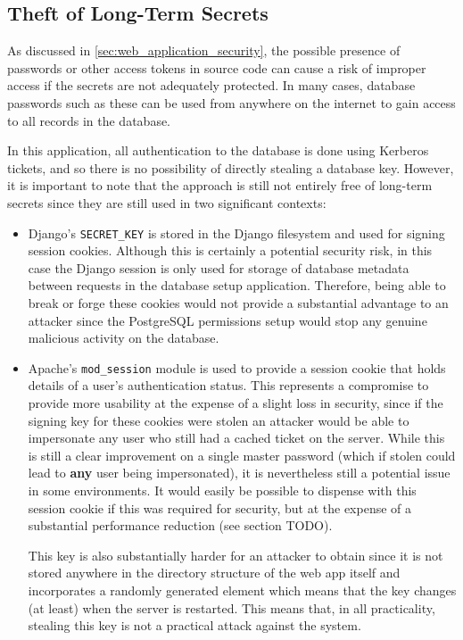 \documentclass{report}
\begin{document}
\subsection{Theft of Long-Term Secrets}
As discussed in \autoref{sec:web_application_security}, the possible presence of passwords or other access tokens in source code can cause a risk of improper access if the secrets are not adequately protected. In many cases, database passwords such as these can be used from anywhere on the internet to gain access to all records in the database.

In this application, all authentication to the database is done using Kerberos tickets, and so there is no possibility of directly stealing a database key. However, it is important to note that the approach is still not entirely free of long-term secrets since they are still used in two significant contexts:
\begin{itemize}
\item
  Django's \verb+SECRET_KEY+ is stored in the Django filesystem and used for signing session cookies. Although this is certainly a potential security risk, in this case the Django session is only used for storage of database metadata between requests in the database setup application. Therefore, being able to break or forge these cookies would not provide a substantial advantage to an attacker since the PostgreSQL permissions setup would stop any genuine malicious activity on the database.
\item
  Apache's \verb+mod_session+ module is used to provide a session cookie that holds details of a user's authentication status. This represents a compromise to provide more usability at the expense of a slight loss in security, since if the signing key for these cookies were stolen an attacker would be able to impersonate any user who still had a cached ticket on the server. While this is still a clear improvement on a single master password (which if stolen could lead to \textbf{any} user being impersonated), it is nevertheless still a potential issue in some environments. It would easily be possible to dispense with this session cookie if this was required for security, but at the expense of a substantial performance reduction (see section TODO).

  This key is also substantially harder for an attacker to obtain since it is not stored anywhere in the directory structure of the web app itself and incorporates a randomly generated element which means that the key changes (at least) when the server is restarted. This means that, in all practicality, stealing this key is not a practical attack against the system.
\end{itemize}
\end{document}
